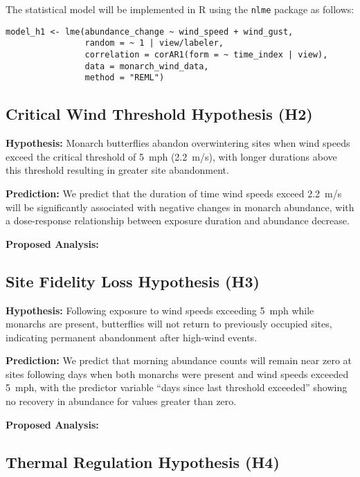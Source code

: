 The statistical model will be implemented in R using the \texttt{nlme} package as follows:

\begin{verbatim}
model_h1 <- lme(abundance_change ~ wind_speed + wind_gust,
                random = ~ 1 | view/labeler,
                correlation = corAR1(form = ~ time_index | view),
                data = monarch_wind_data,
                method = "REML")
\end{verbatim}

\subsection{Critical Wind Threshold Hypothesis (H2)}

\textbf{Hypothesis:} Monarch butterflies abandon overwintering sites when wind speeds exceed the critical threshold of 5~mph (2.2~m/s), with longer durations above this threshold resulting in greater site abandonment.

\textbf{Prediction:} We predict that the duration of time wind speeds exceed 2.2~m/s will be significantly associated with negative changes in monarch abundance, with a dose-response relationship between exposure duration and abundance decrease.

\textbf{Proposed Analysis:}

\subsection{Site Fidelity Loss Hypothesis (H3)}

\textbf{Hypothesis:} Following exposure to wind speeds exceeding 5~mph while monarchs are present, butterflies will not return to previously occupied sites, indicating permanent abandonment after high-wind events.

\textbf{Prediction:} We predict that morning abundance counts will remain near zero at sites following days when both monarchs were present and wind speeds exceeded 5~mph, with the predictor variable ``days since last threshold exceeded'' showing no recovery in abundance for values greater than zero.

\textbf{Proposed Analysis:}

\subsection{Thermal Regulation Hypothesis (H4)}

